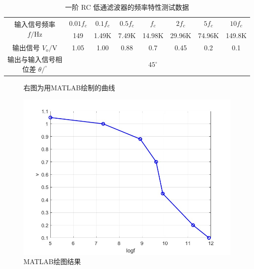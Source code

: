 \documentclass[10pt, a4paper]{article} %
\begin{document}
\begin{table}[htbp]
    \centering
    \caption{一阶 RC 低通滤波器的频率特性测试数据}
    \label{tab:rc_filter_data}
    \begin{tabular}{|c|c|c|c|c|c|c|c|}
    \hline
    \multirow{2}{*}{输入信号频率 $f/\text{Hz}$} & \textbf{$0.01f_c$} & \textbf{$0.1f_c$} & \textbf{$0.5f_c$} & \textbf{$f_c$} & \textbf{$2f_c$} & \textbf{$5f_c$} & \textbf{$10f_c$} \\ \cline{2-8}
    &149  &1.49K  &7.49K  &14.98K  &29.96K  &74.96K  &149.8K  \\ \hline %
    输出信号 $V_o/\text{V}$ &1.05  &1.00 &0.88 &0.7 &0.45 &0.2 &0.1 \\ \hline
    输出与输入信号相位差 $\theta/^\circ$ &\diagbox{}{} &\diagbox{}{} &\diagbox{}{} &$45^{\circ}$ &\diagbox{}{} &\diagbox{}{} & \diagbox{}{}\\ \hline
    \end{tabular}
\end{table}

\begin{figure}[ht]
    \centering
    \begin{minipage}[ht]{0.56\textwidth}
        右图为用MATLAB绘制的曲线
    \end{minipage}
    \hfill
    \begin{minipage}[ht]{0.4\textwidth}
        \centering
        \includegraphics[width=\linewidth]{image/1.jpg}
        \caption{MATLAB绘图结果}
        \label{fig:side:ii}
    \end{minipage}
\end{figure}
\end{document}
